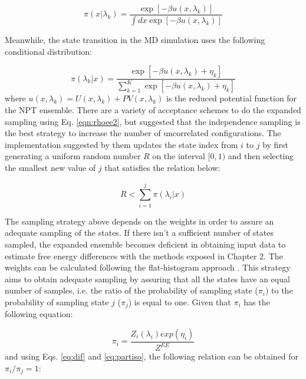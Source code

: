 \begin{equation}
\pi(x|\lambda_{k}) = \dfrac{\exp[-\beta u(x,\lambda_{k})]}{\int dx \exp [- \beta u(x,\lambda_{k})]}
\label{eqn:rhoee1}
\end{equation} 

Meanwhile, the state transition in the MD simulation uses the following conditional distribution:

\begin{equation}
\pi(\lambda_{k}|x) = \dfrac{\exp[-\beta u(x,\lambda_{k}) + \eta_{k}]}{ \sum_{k=1}^{K} \exp [- \beta u(x,\lambda_{k})+ \eta_{k}]}
\label{eqn:rhoee2}
\end{equation} 
where $u(x,\lambda_{k}) = U(x,\lambda_{k}) + PV(x,\lambda_{k})$ is the reduced potential function for the NPT ensemble. There are a variety of acceptance schemes to do the expanded sampling using Eq. \eqref{eqn:rhoee2}, but  suggested that the independence sampling \cite{liu2002} is the best strategy to increase the number of uncorrelated configurations. The implementation suggested by them updates the state index from $i$ to $j$ by first generating a uniform random number $R$ on the interval $[0,1)$ and then selecting the smallest new value of $j$ that satisfies  the relation below:

\begin{equation}
R < \sum_{i=1}^{j} \pi(\lambda_{i}|x) 
\label{eqn:relee2}
\end{equation} 

The sampling strategy above depends on the weights in order to assure an adequate sampling of the states. If there isn't a sufficient number of states sampled, the expanded ensemble becomes deficient in obtaining input data to estimate free energy differences with the methods exposed in Chapter 2. The weights can be calculated following the flat-histogram approach \cite{bernd1992,bernd1993,dayal2004}. This strategy aims to obtain adequate sampling by assuring that all the states have an equal number of samples, i.e. the ratio of the probability of sampling state ($\pi_{i}$) to the probability of sampling state $j$ ($\pi_{j}$) is equal to one. Given that $\pi_{i}$ has the following equation:

\begin{equation}
\pi_{i} = \dfrac{Z_{i}(\lambda_{i}) exp(\eta_{i})}{Z^{EE}} 
\label{eqn:wei1}
\end{equation} 
and using Eqs. \ref{eq:dif} and \ref {eq:partiso}, the following relation can be obtained for $\pi_{i}/\pi_{j}=1$:

